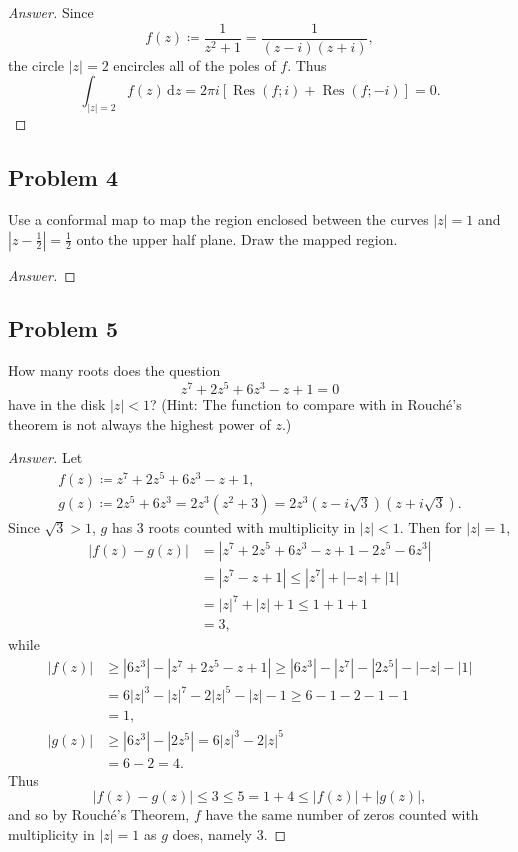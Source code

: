 \documentclass[12pt]{article}
\newcommand\paren[1]{\left( #1 \right)}
\newcommand{\sqbrack}[1]{\left [ #1 \right ]}
\newcommand{\abs}[1]{\left| #1 \right|}
\renewcommand{\i}[4]{\int_{#1}^{#2} {#3} \, \mathrm{d} {#4} }
\theoremstyle{definition}
\DeclareMathOperator\Res{Res}
\begin{document}
\begin{proof}[Answer]
    Since 
    \[
        f(z) \coloneqq \frac{1}{z^2 + 1} = \frac{1}{(z - i)(z+ i)} , 
    \]
    the circle $\abs{z} = 2$ encircles all of the poles of $f$. Thus 
    \[
        \i{\abs{z} = 2}{}{f(z)}{z} = 2\pi i \sqbrack{ \Res(f;i) + \Res(f;-i) } = \boxed{0.}
    \]
\end{proof}

\subsection{Problem 4}
Use a conformal map to map the region enclosed between the curves $\abs{z} = 1$ and $\abs{z - \frac{1}{2}} = \frac{1}{2}$ onto the upper half plane. Draw the mapped region. 
\begin{proof}[Answer]
    
\end{proof}

\subsection{Problem 5 \texorpdfstring{\cite{Joel}}{}}
How many roots does the question 
\[
    z^7 + 2z^5 + 6z^3 - z + 1 = 0
\]
have in the disk $\abs{z} < 1$? (Hint: The function to compare with in Rouch\'e's theorem is not always the highest power of $z$.)
\begin{proof}[Answer]
    Let 
    \begin{align*}
        f(z) \coloneqq z^7 + 2z^5 + 6z^3 - z + 1 , \\ 
        g(z) \coloneqq 2z^5 + 6z^3 = 2z^3 \paren{ z^2 + 3 } = 2z^3 \paren{ z - i \sqrt{3} } \paren{ z + i \sqrt{3} } . 
    \end{align*}
    Since $\sqrt{3} > 1$, $g$ has 3 roots counted with multiplicity in $\abs{z} < 1$. Then for $\abs{z} = 1$, 
    \begin{align*}
        \abs{ f(z) - g(z) } & = \abs{ z^7 + 2z^5 + 6z^3 - z + 1 - 2z^5 - 6z^3 } \\ 
        & = \abs{ z^7 - z + 1 } \leq \abs{ z^7 } + \abs{ -z } + \abs{1} \\ 
        & = \abs{z}^7 + \abs{z} + 1 \leq 1 + 1 + 1 \\ 
        & = 3 , 
    \end{align*}
    while 
    \begin{align*}
        \abs{ f(z) } & \geq \abs{ 6z^3 } - \abs{ z^7 + 2z^5 - z + 1 } \geq \abs{ 6z^3 } - \abs{ z^7 } - \abs{ 2z^5 } - \abs{ -z } - \abs{1} \\ 
        & = 6 \abs{z}^3 - \abs{z}^7 - 2 \abs{z}^5 - \abs{z} - 1 \geq 6 - 1 - 2 - 1 - 1 \\ 
        & = 1 , \\ 
        \abs{ g(z) } & \geq \abs{ 6z^3 } - \abs{ 2z^5 } = 6 \abs{z}^3 - 2 \abs{z}^5 \\ 
        & = 6 - 2 = 4 .
    \end{align*}
    Thus 
    \[
        \abs{ f(z) - g(z) } \leq 3 \leq 5 = 1 + 4 \leq \abs{f(z)} + \abs{g(z)} ,
    \]
    and so by Rouch\'e's Theorem, $f$ have the same number of zeros counted with multiplicity in $\abs{z} = 1$ as $g$ does, namely $\boxed{3.}$
\end{proof}
\end{document}
